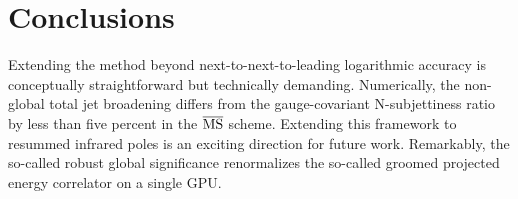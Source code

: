 \section{Conclusions}\label{sec:conclusions}

Extending the method beyond next-to-next-to-leading logarithmic accuracy
is conceptually straightforward but technically demanding. Numerically,
the non-global total jet broadening differs from the gauge-covariant
N-subjettiness ratio by less than five percent in the $\overline{\rm
MS}$ scheme. Extending this framework to resummed infrared poles is an
exciting direction for future work. Remarkably, the so-called robust
global significance renormalizes the so-called groomed projected energy
correlator on a single GPU.


